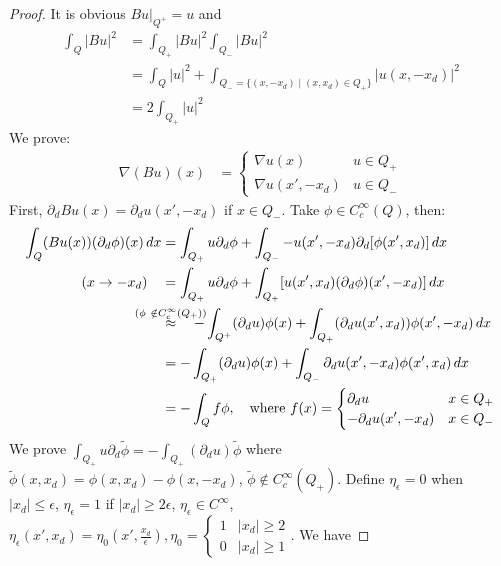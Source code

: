 \documentclass{report}
\theoremstyle{tommy}
\begin{document}
  \begin{proof}
    It is obvious \(Bu|_{Q^+} = u\) and
    \begin{align*}
      \int_Q|Bu|^2 
      &= \int_{Q_+} |Bu|^2  \int_{Q_-}|Bu|^2 \\
      &= \int_Q |u|^2 + \int_{Q_- = \{(x,-x_d) \mid (x,x_d) \in Q_+\}} |u(x,-x_d)|^2 \\
      &= 2 \int_{Q_+} |u|^2
    \end{align*}
    We prove:
    \begin{align*}
      \nabla (Bu)(x) &= \begin{cases}
        \nabla u(x) & u \in Q_+ \\ \nabla u(x', -x_d) & u \in Q_-
      \end{cases}
    \end{align*}
    First, \(\partial_d Bu(x) = \partial_d u(x', -x_d)\) if \(x \in Q_-\). Take \(\phi \in C_c^\infty(Q)\), then:
    \begin{align*}
      \int_Q (Bu(x)) (\partial_d \phi) (x) \, dx 
      &= \int_{Q_+} u \partial_d \phi + \int_{Q_-} - u(x', -x_d) \partial_d [\phi(x', x_d)] \, dx \\
      (x \to -x_d) \quad &= \int_{Q_+} u \partial_d \phi + \int_{Q_+}[u(x', x_d) (\partial_d \phi) (x', -x_d)]\, dx \\
      &\overset{\mathclap{(\phi \notin C_c^\infty(Q_+))}}\approx \quad - \int_{Q^+} (\partial_d u) \phi(x) + \int_{Q_+}(\partial_d u (x', x_d)) \phi(x', -x_d) \, dx \\
      &= - \int_{Q_+} (\partial_d u) \phi(x) + \int_{Q_-} \partial_d u(x', -x_d) \phi(x', x_d) \, dx \\
      &= - \int_Q f \phi, \quad \text{where \(f(x) = \begin{cases}
        \partial_d u & x \in Q_+ \\ - \partial_d u(x',-x_d) & x \in Q_-
      \end{cases}\)} 
    \end{align*}
    We prove \(\int_{Q_+} u \partial_d \tilde \phi = - \int_{Q_+} (\partial_d u) \tilde \phi\) where \(\tilde \phi(x,x_d) = \phi(x,x_d) - \phi(x, -x_d)\), \(\tilde \phi \notin C_c^\infty(Q_+)\). Define \(\eta_\epsilon = 0\) when \(|x_d| \le \epsilon\), \(\eta_\epsilon = 1\) if \(|x_d| \ge 2 \epsilon\), \(\eta_\epsilon \in C^\infty\), \(\eta_\epsilon(x', x_d) = \eta_0(x', \frac{x_d}{\epsilon}), \eta_0 = \begin{cases}
      1 & |x_d| \ge 2 \\ 0 & |x_d| \ge 1\end{cases}\). We have 

\end{proof}
\end{document}
